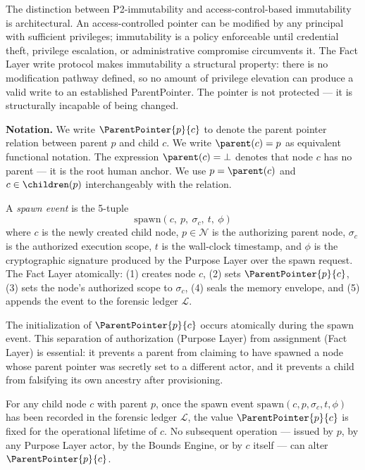 The distinction between P2-immutability and access-control-based immutability is architectural. An access-controlled pointer can be modified by any principal with sufficient privileges; immutability is a policy enforceable until credential theft, privilege escalation, or administrative compromise circumvents it. The Fact Layer write protocol makes immutability a structural property: there is no modification pathway defined, so no amount of privilege elevation can produce a valid write to an established ParentPointer. The pointer is not protected --- it is structurally incapable of being changed.

\bigskip
\noindent\textbf{Notation.} We write $\ParentPointer{p}{c}$ to denote the parent pointer relation between parent $p$ and child $c$. We write $\parent(c) = p$ as equivalent functional notation. The expression $\parent(c) = \bot$ denotes that node $c$ has no parent --- it is the root human anchor. We use $p = \parent(c)$ and $c \in \children(p)$ interchangeably with the relation.

\begin{dfn}
\label{dfn:spawn-event}
A \emph{spawn event} is the 5-tuple
\begin{equation}
\mathrm{spawn}(c,\ p,\ \sigma_c,\ t,\ \phi)
\end{equation}
where $c$ is the newly created child node, $p \in \mathcal{N}$ is the authorizing parent node, $\sigma_c$ is the authorized execution scope, $t$ is the wall-clock timestamp, and $\phi$ is the cryptographic signature produced by the Purpose Layer over the spawn request. The Fact Layer atomically: (1) creates node $c$, (2) sets $\ParentPointer{p}{c}$, (3) sets the node's authorized scope to $\sigma_c$, (4) seals the memory envelope, and (5) appends the event to the forensic ledger $\mathcal{L}$.
\end{dfn}

The initialization of $\ParentPointer{p}{c}$ occurs atomically during the spawn event. This separation of authorization (Purpose Layer) from assignment (Fact Layer) is essential: it prevents a parent from claiming to have spawned a node whose parent pointer was secretly set to a different actor, and it prevents a child from falsifying its own ancestry after provisioning.

\begin{prop}
\label{prop:parent-pointer-immutable}
For any child node $c$ with parent $p$, once the spawn event $\mathrm{spawn}(c, p, \sigma_c, t, \phi)$ has been recorded in the forensic ledger $\mathcal{L}$, the value $\ParentPointer{p}{c}$ is fixed for the operational lifetime of $c$. No subsequent operation --- issued by $p$, by any Purpose Layer actor, by the Bounds Engine, or by $c$ itself --- can alter $\ParentPointer{p}{c}$.
\end{prop}

